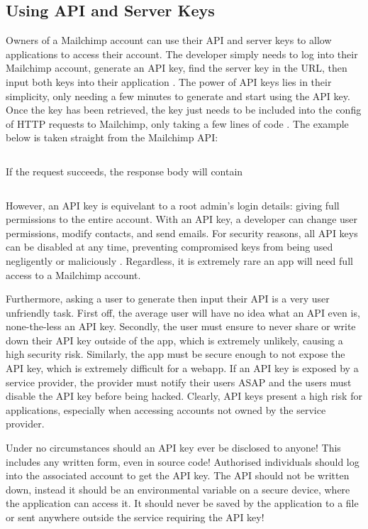 \documentclass[11pt]{article}
\begin{document}
\subsection{Using API and Server Keys}

Owners of a Mailchimp account can use their API and server keys to allow applications to access their account. The developer simply needs to log into their Mailchimp account, generate an API key, find the server key in the URL, then input both keys into their application \cite{mailchimp-api-key}. The power of API keys lies in their simplicity, only needing a few minutes to generate and start using the API key. Once the key has been retrieved, the key just needs to be included into the config of HTTP requests to Mailchimp, only taking a few lines of code \cite{mailchimp-first-api-call}. The example below is taken straight from the Mailchimp API:

\inputminted[linenos=true]{python}{mailchimp_examples/mailchimp_ping.py}

\noindent
If the request succeeds, the response body will contain

\inputminted{json}{mailchimp_examples/ping_response.json}

However, an API key is equivelant to a root admin's login details: giving full permissions to the entire account. With an API key, a developer can change user permissions, modify contacts, and send emails. For security reasons, all API keys can be disabled at any time, preventing compromised keys from being used negligently or maliciously \cite{mailchimp-api-key}. Regardless, it is extremely rare an app will need full access to a Mailchimp account.

Furthermore, asking a user to generate then input their API is a very user unfriendly task. First off, the average user will have no idea what an API even is, none-the-less an API key. Secondly, the user must ensure to never share or write down their API key outside of the app, which is extremely unlikely, causing a high security risk. Similarly, the app must be secure enough to not expose the API key, which is extremely difficult for a webapp. If an API key is exposed by a service provider, the provider must notify their users ASAP and the users must disable the API key before being hacked. Clearly, API keys present a high risk for applications, especially when accessing accounts not owned by the service provider.

\begin{warn}
Under no circumstances should an API key ever be disclosed to anyone! This includes any written form, even in source code! Authorised individuals should log into the associated account to get the API key. The API should not be written down, instead it should be an environmental variable on a secure device, where the application can access it. It should never be saved by the application to a file or sent anywhere outside the service requiring the API key!
\end{warn}
\end{document}
